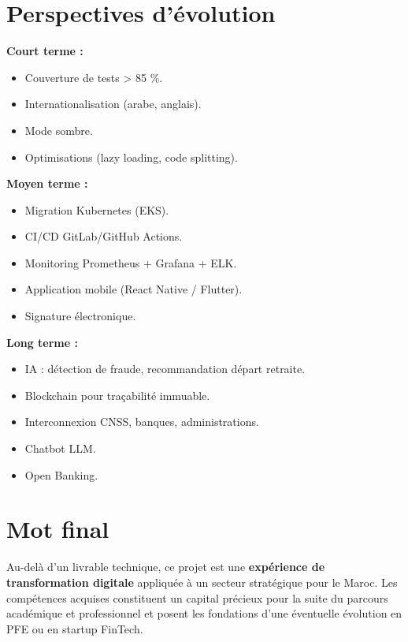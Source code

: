 \documentclass[12pt,a4paper,oneside]{report}
\begin{document}
\section*{Perspectives d'évolution}

\textbf{Court terme :}
\begin{itemize}
    \item Couverture de tests \textgreater{} 85 \%.
    \item Internationalisation (arabe, anglais).
    \item Mode sombre.
    \item Optimisations (lazy loading, code splitting).
\end{itemize}

\textbf{Moyen terme :}
\begin{itemize}
    \item Migration Kubernetes (EKS).
    \item CI/CD GitLab/GitHub Actions.
    \item Monitoring Prometheus + Grafana + ELK.
    \item Application mobile (React Native / Flutter).
    \item Signature électronique.
\end{itemize}

\textbf{Long terme :}
\begin{itemize}
    \item IA : détection de fraude, recommandation départ retraite.
    \item Blockchain pour traçabilité immuable.
    \item Interconnexion CNSS, banques, administrations.
    \item Chatbot LLM.
    \item Open Banking.
\end{itemize}

\section*{Mot final}
Au-delà d'un livrable technique, ce projet est une \textbf{expérience de transformation digitale} appliquée à un secteur stratégique pour le Maroc. Les compétences acquises constituent un capital précieux pour la suite du parcours académique et professionnel et posent les fondations d'une éventuelle évolution en PFE ou en startup FinTech.

\end{document}
